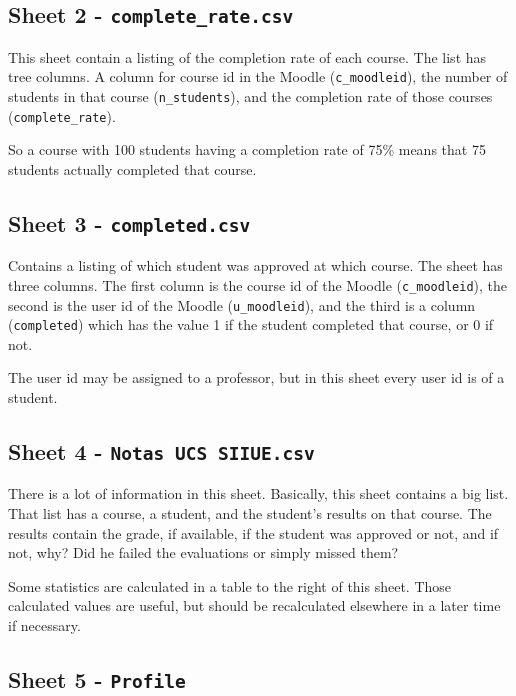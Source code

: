 \subsection{Sheet 2 - \texttt{complete\_rate.csv}}

This sheet contain a listing of the completion rate of each course. The list
has tree columns. A column for course id in the Moodle (\texttt{c\_moodleid}),
the number of students in that course (\texttt{n\_students}), and the
completion rate of those courses (\texttt{complete\_rate}).

So a course with 100 students having a completion rate of 75\% means that 75
students actually completed that course.

\subsection{Sheet 3 - \texttt{completed.csv}}

Contains a listing of which student was approved at which course. The sheet has
three columns. The first column is the course id of the Moodle
(\texttt{c\_moodleid}), the second is the user id of the Moodle
(\texttt{u\_moodleid}), and the third is a column (\texttt{completed}) which
has the value 1 if the student completed that course, or 0 if not.

The user id may be assigned to a professor, but in this sheet every user id is
of a student.

\subsection{Sheet 4 - \texttt{Notas UCS SIIUE.csv}}

There is a lot of information in this sheet. Basically, this sheet contains a
big list. That list has a course, a student, and the student's results on that
course. The results contain the grade, if available, if the student was
approved or not, and if not, why? Did he failed the evaluations or simply
missed them?

Some statistics are calculated in a table to the right of this sheet. Those
calculated values are useful, but should be recalculated elsewhere in a later
time if necessary.

\subsection{Sheet 5 - \texttt{Profile}}
\label{sec:data_profiling}

